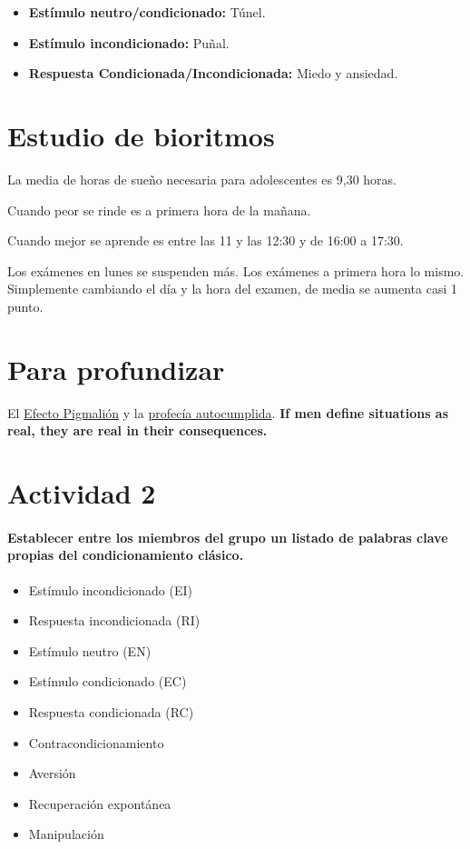 \documentclass[palatino,nochap]{apuntesURJC}
\begin{document}
\begin{itemize}
\item \textbf{Estímulo neutro/condicionado:} Túnel.
\item \textbf{Estímulo incondicionado:} Puñal.
\item \textbf{Respuesta Condicionada/Incondicionada:} Miedo y ansiedad.
\end{itemize}

\section{Estudio de bioritmos}

La media de horas de sueño necesaria para adolescentes es 9,30 horas.

Cuando peor se rinde es a primera hora de la mañana.

Cuando mejor se aprende es entre las 11 y las 12:30 y de 16:00 a 17:30.

Los exámenes en lunes se suspenden más. Los exámenes a primera hora lo mismo.
Simplemente cambiando el día y la hora del examen, de media se aumenta casi 1 punto.

\section{Para profundizar}


El \href{https://es.wikipedia.org/wiki/Efecto\_Pigmali\%C3\%B3n}{Efecto Pigmalión} y la \href{https://es.wikipedia.org/wiki/Profec\%C3\%ADa\_autocumplida}{profecía autocumplida}. 
%
\textbf{If men define situations as real, they are real in their consequences.} 


\section{Actividad 2}

\paragraph{Establecer entre los miembros del grupo un listado de palabras clave propias del condicionamiento clásico.}

\begin{itemize}
\item Estímulo incondicionado (EI)
\item Respuesta incondicionada (RI)
\item Estímulo neutro (EN)
\item Estímulo condicionado (EC)
\item Respuesta condicionada (RC)
\item Contracondicionamiento
\item Aversión
\item Recuperación expontánea
\item Manipulación
\end{itemize}
\end{document}
